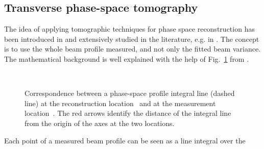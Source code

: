\subsection{Transverse phase-space tomography}
%
The idea of applying tomographic techniques for phase space reconstruction
has been introduced in \cite{McKee1995} and extensively studied in the
literature, e.g. in \cite{Lohl2005, Hock2011}.
The concept is to use the whole beam profile measured, and not only the
fitted beam variance. 
The mathematical background is well explained with the help of
Fig.~\ref{fig:tomoPhaseSpaces} from \cite{Hock2011}.
%
\begin{figure}
\centering
{}
\,
%
\caption{
Correspondence between a phase-space profile integral line (dashed line) at the reconstruction location~\protect{} and at the measurement location~\protect{}.
The red arrows identify the distance of the integral line from the origin of the axes at the two locations.
}
\label{fig:tomoPhaseSpaces}
\end{figure}
%
Each point of a measured beam profile can be seen as a line integral over the
